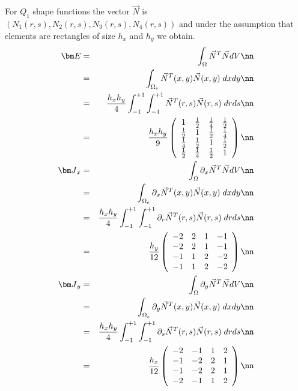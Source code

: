 For $Q_1$ shape functions the vector $\vec{N}$ is $(N_1(r,s),N_2(r,s),N_3(r,s),N_4(r,s))$ and under the assumption 
that elements are rectangles of size $h_x$ and $h_y$ we obtain. 
\begin{eqnarray}
{\bm E} 
&=&\int_\Omega \vec{N}^T \vec{N} dV  \nn\\
&=& \int_{\Omega_e} \vec{N}^T(x,y) \vec{N}(x,y)\;  dx dy  \nn\\
&=& \frac{h_xh_y}{4} \int_{-1}^{+1} \int_{-1}^{+1} \vec{N}^T(r,s) \vec{N}(r,s)\;  dr ds  \nn\\
&=& \frac{h_x h_y}{9}\left(
\begin{array}{cccc}
1 & \frac{1}{2} & \frac{1}{4} & \frac{1}{2}\\
\frac{1}{2}&  1& \frac{1}{2} & \frac{1}{4}\\ 
\frac{1}{4} & \frac{1}{2} & 1 & \frac{1}{2}\\
\frac{1}{2} & \frac{1}{4} & \frac{1}{2} & 1
\end{array}
\right) 
\nn\\
{\bm J}_x &=& \int_\Omega \partial_x\vec{N}^T \vec{N} dV  \nn\\
&=& \int_{\Omega_e} \partial_x\vec{N}^T(x,y) \vec{N}(x,y)\;  dx dy  \nn\\
&=& \frac{h_xh_y}{4} \int_{-1}^{+1} \int_{-1}^{+1} \partial_r\vec{N}^T(r,s) \vec{N}(r,s)\;  dr ds  \nn\\
&=& \frac{h_y}{12}
\left(\begin{array}{cccc}
-2 & 2 & 1 & -1\\
-2 & 2  &  1 & -1\\
-1 & 1  &  2 & -2\\
-1 & 1 & 2 &-2
\end{array}
\right)
\nn\\
{\bm J}_y &=&
\int_\Omega \partial_y\vec{N}^T \vec{N} dV \nn\\
&=& \int_{\Omega_e} \partial_y\vec{N}^T(x,y) \vec{N}(x,y)\;  dx dy  \nn\\
&=& \frac{h_xh_y}{4} \int_{-1}^{+1} \int_{-1}^{+1} \partial_s\vec{N}^T(r,s) \vec{N}(r,s)\;  dr ds \nn \\
&=&\frac{h_x}{12}
\left(\begin{array}{cccc}
-2 & -1 & 1 & 2\\
-1 & -2 & 2 & 1\\
-1 & -2 & 2 & 1\\
-2 & -1 & 1 & 2
\end{array}
\right) \nn
\end{eqnarray}

